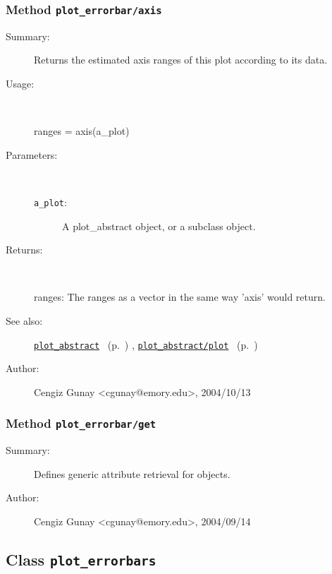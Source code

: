 \subsubsection[Method \texttt{axis}]{Method \texttt{plot\_errorbar/axis}}%
%
\label{ref_plot_errorbar__axis}%
\hypertarget{ref_plot_errorbar__axis}{}%
\begin{description}
\item[Summary:]Returns the estimated axis ranges of this plot according to its data.
%
\item[Usage:]~%
\begin{lyxcode}%
ranges = axis(a\_plot)
%
\end{lyxcode}%
%
%
\item[Parameters:]~
\begin{description}%
\item[\texttt{a\_plot}:]
 A plot\_abstract object, or a subclass object.
\end{description}%
%
\item[Returns:
]~

	ranges: The ranges as a vector in the same way 'axis' would return.
%
%
\item[See also:]%
\hyperlink{ref_plot_abstract}{\texttt{plot\_abstract}}%
\ (p.~\pageref{ref_plot_abstract})%
%
, \hyperlink{ref_plot_abstract__plot}{\texttt{plot\_abstract/plot}}%
\ (p.~\pageref{ref_plot_abstract__plot})%
%
%
\item[Author:]%
Cengiz Gunay <cgunay@emory.edu>, 2004/10/13
%
\end{description}
\methodline%
\subsubsection[Method \texttt{get}]{Method \texttt{plot\_errorbar/get}}%
%
\label{ref_plot_errorbar__get}%
\hypertarget{ref_plot_errorbar__get}{}%
\begin{description}
\item[Summary:]Defines generic attribute retrieval for objects.
%
%
%
%
%
%
%
\item[Author:]%
Cengiz Gunay <cgunay@emory.edu>, 2004/09/14
%
\end{description}
\methodline%
\subsection{Class \texttt{plot\_errorbars}}%
%
\label{ref_plot_errorbars}%
\hypertarget{ref_plot_errorbars}{}%

